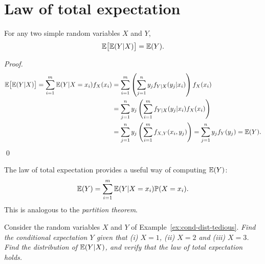 \section{Law of total expectation}

\begin{theorem}\label{thm:law_of_total_expectation}
For any two simple random variables $X$ and $Y$,
\[
\mathbb{E}\big[\mathbb{E}(Y|X)\big] = \mathbb{E}(Y).
\]
\end{theorem}
\begin{proof}
\begin{align*}
\mathbb{E}\big[\mathbb{E}(Y|X)\big] 
	= \sum_{i=1}^m \mathbb{E}(Y|X=x_i) f_X(x_i)
	& = \sum_{i=1}^m \left(\sum_{j=1}^n y_j f_{Y|X}(y_j|x_i)\right) f_X(x_i) \\
	& = \sum_{j=1}^n y_j \left(\sum_{i=1}^m f_{Y|X}(y_j|x_i)f_X(x_i)\right) \\
	& = \sum_{j=1}^n y_j \left(\sum_{i=1}^m f_{X,Y}(x_i,y_j)\right)
	= \sum_{j=1}^n y_j f_Y(y_j)
	= \mathbb{E}(Y).
\end{align*}
\qed
\end{proof}

\begin{remark}
The law of total expectation provides a useful way of computing $\mathbb{E}(Y)$:
\[
\mathbb{E}(Y) = \sum_{i=1}^m \mathbb{E}(Y|X=x_i)\mathbb{P}(X=x_i).
\]
This is analogous to the \emph{partition theorem}.
\end{remark}

\begin{example}
Consider the random variables $X$ and $Y$ of Example~\ref{ex:cond-dist-tedious}.
\ben
\it Find the conditional expectation $Y$ given that (i) $X=1$, (ii) $X=2$ and (iii) $X=3$.
\it Find the distribution of $\mathbb{E}(Y|X)$, and verify that the law of total expectation holds.
\een
\end{example}

